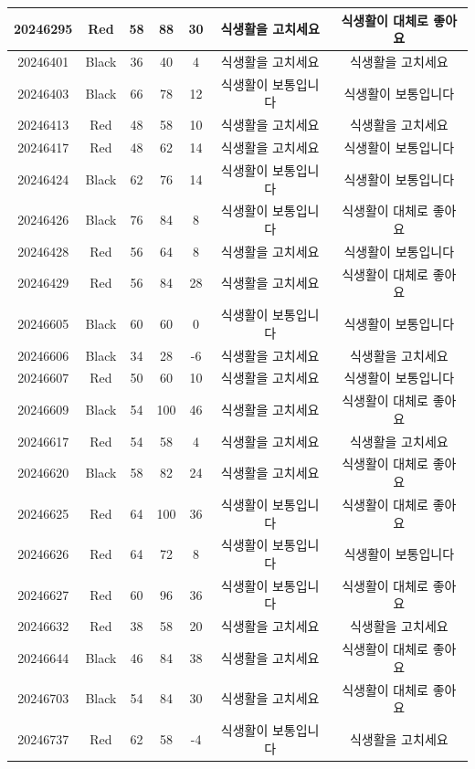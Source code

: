 \documentclass[
]{book}
\begin{document}
\begin{tabular}{c|c|c|c|c|c|c}
\hline
20246295 & Red & 58 & 88 & 30 & 식생활을 고치세요 & 식생활이 대체로 좋아요\\
\hline
20246401 & Black & 36 & 40 & 4 & 식생활을 고치세요 & 식생활을 고치세요\\
\hline
20246403 & Black & 66 & 78 & 12 & 식생활이 보통입니다 & 식생활이 보통입니다\\
\hline
20246413 & Red & 48 & 58 & 10 & 식생활을 고치세요 & 식생활을 고치세요\\
\hline
20246417 & Red & 48 & 62 & 14 & 식생활을 고치세요 & 식생활이 보통입니다\\
\hline
20246424 & Black & 62 & 76 & 14 & 식생활이 보통입니다 & 식생활이 보통입니다\\
\hline
20246426 & Black & 76 & 84 & 8 & 식생활이 보통입니다 & 식생활이 대체로 좋아요\\
\hline
20246428 & Red & 56 & 64 & 8 & 식생활을 고치세요 & 식생활이 보통입니다\\
\hline
20246429 & Red & 56 & 84 & 28 & 식생활을 고치세요 & 식생활이 대체로 좋아요\\
\hline
20246605 & Black & 60 & 60 & 0 & 식생활이 보통입니다 & 식생활이 보통입니다\\
\hline
20246606 & Black & 34 & 28 & -6 & 식생활을 고치세요 & 식생활을 고치세요\\
\hline
20246607 & Red & 50 & 60 & 10 & 식생활을 고치세요 & 식생활이 보통입니다\\
\hline
20246609 & Black & 54 & 100 & 46 & 식생활을 고치세요 & 식생활이 대체로 좋아요\\
\hline
20246617 & Red & 54 & 58 & 4 & 식생활을 고치세요 & 식생활을 고치세요\\
\hline
20246620 & Black & 58 & 82 & 24 & 식생활을 고치세요 & 식생활이 대체로 좋아요\\
\hline
20246625 & Red & 64 & 100 & 36 & 식생활이 보통입니다 & 식생활이 대체로 좋아요\\
\hline
20246626 & Red & 64 & 72 & 8 & 식생활이 보통입니다 & 식생활이 보통입니다\\
\hline
20246627 & Red & 60 & 96 & 36 & 식생활이 보통입니다 & 식생활이 대체로 좋아요\\
\hline
20246632 & Red & 38 & 58 & 20 & 식생활을 고치세요 & 식생활을 고치세요\\
\hline
20246644 & Black & 46 & 84 & 38 & 식생활을 고치세요 & 식생활이 대체로 좋아요\\
\hline
20246703 & Black & 54 & 84 & 30 & 식생활을 고치세요 & 식생활이 대체로 좋아요\\
\hline
20246737 & Red & 62 & 58 & -4 & 식생활이 보통입니다 & 식생활을 고치세요\\

\end{tabular}
\end{document}
